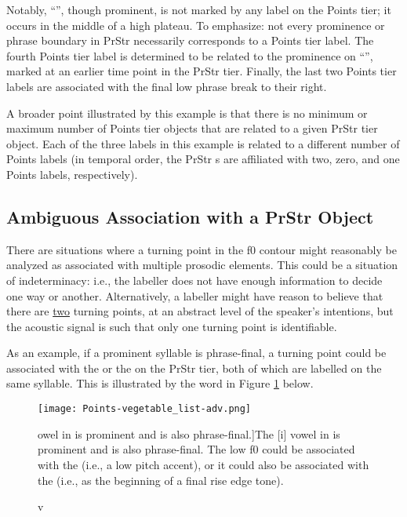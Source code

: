 Notably, “”, though prominent, is not marked by any label on the Points tier; it occurs in the middle of a high plateau. To emphasize: not every prominence or phrase boundary in PrStr necessarily corresponds to a Points tier label. The fourth Points tier label is determined to be related to the prominence on “”, marked at an earlier time point in the PrStr tier. Finally, the last two Points tier labels are associated with the final low phrase break to their right.

A broader point illustrated by this example is that there is no minimum or maximum number of Points tier objects that are related to a given PrStr tier object. Each of the three \textlabel{*} labels in this example is related to a different number of Points labels (in temporal order, the PrStr \textlabel{*}s are affiliated with two, zero, and one Points labels, respectively).

\subsection{Ambiguous Association with a PrStr Object}\label{sec:ambiguous-association-with-a-prstr-object}

There are situations where a turning point in the f0 contour might reasonably be analyzed as associated with multiple prosodic elements. This could be a situation of indeterminacy: i.e., the labeller does not have enough information to decide one way or another. Alternatively, a labeller might have reason to believe that there are \uline{two} turning points, at an abstract level of the speaker’s intentions, but the acoustic signal is such that only one turning point is identifiable.

As an example, if a prominent syllable is phrase-final, a turning point could be associated with the \textlabel{*} or the \textlabel{]} on the PrStr tier, both of which are labelled on the same syllable. This is illustrated by the word  in Figure \ref{fig:vegetable_list Points Adv} below.

\begin{figure}[H]
\centering
%
\texttt{[image: Points-vegetable\_list-adv.png]}
%
\caption[The [i] vowel in  is prominent and is also phrase-final.]{The [i] vowel in  is prominent and is also phrase-final. The low f0 could be associated with the \textlabel{*} (i.e., a low pitch accent), or it could also be associated with the \textlabel{]} (i.e., as the beginning of a final rise edge tone).%
\label{fig:vegetable_list Points Adv}%
}
\end{figure}

